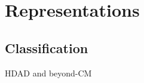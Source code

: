 
\section{Representations}
\subsection{Classification}
% 




% 
\begin{frame}{HDAD and beyond-CM}

\end{frame}

